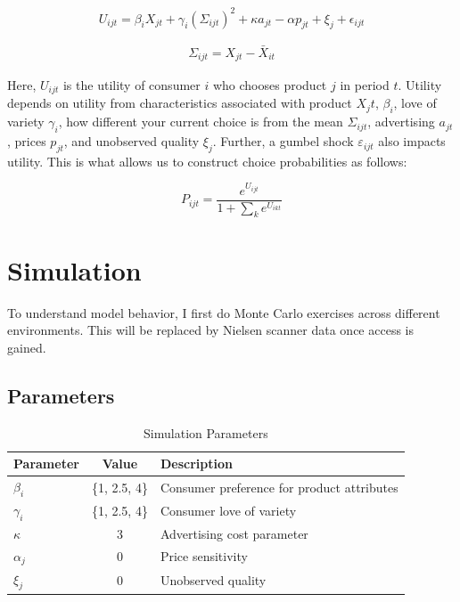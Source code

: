 \documentclass[11pt]{article}
\theoremstyle{definition}
\theoremstyle{remark}
\begin{document}
\begin{equation}
  U_{ijt} = \beta_i X_{jt} + \gamma_{i}(\Sigma_{ijt})^2 + \kappa a_{jt} - \alpha p_{jt} + \xi_j + \epsilon_{ijt}
\end{equation}

\begin{gather*}
  \Sigma_{ijt} = X_{jt}-\bar{X}_{it}
\end{gather*}

Here, $U_{ijt}$ is the utility of consumer $i$ who chooses product $j$ in period $t$. Utility depends on utility from characteristics associated with product $X_jt$, $\beta_i$,
love of variety $\gamma_i$, how different your current choice is from the mean $\Sigma_{ijt}$, advertising $a_{jt}$, prices $p_{jt}$, and unobserved quality $\xi_j$.
Further, a gumbel shock $\varepsilon_{ijt}$ also impacts utility. This is what allows us to construct choice probabilities as follows:

\begin{equation}
  P_{ijt} = \frac{e^{U_{ijt}}}{1 + \sum_{k} e^{U_{ikt}}}
\end{equation}

\section{Simulation}

To understand model behavior, I first do Monte Carlo exercises across different environments. This will be replaced by Nielsen scanner data once access is gained.

\subsection{Parameters}

\begin{table}[hbtp]
  \centering
  \begin{tabular}{lcl}
    \toprule
    Parameter & Value & Description \\
    \midrule
    $\beta_i$ & \{1, 2.5, 4\} & Consumer preference for product attributes \\
    $\gamma_i$ & \{1, 2.5, 4\} & Consumer love of variety \\
    $\kappa$ & 3 & Advertising cost parameter \\
    $\alpha_j$ & 0 & Price sensitivity \\
    $\xi_j$ & 0 & Unobserved quality \\
    \bottomrule
  \end{tabular}
  \caption{Simulation Parameters}
  \label{tab:model_parameters}
\end{table}
\end{document}
